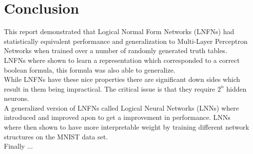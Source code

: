 \chapter{Conclusion}\label{C:con}


This report demonstrated that Logical Normal Form Networks (LNFNs) had statistically equivalent performance and generalization to Multi-Layer Perceptron Networks when trained over a number of randomly generated truth tables. LNFNs where shown to learn a representation which corresponded to a correct boolean formula, this formula was also able to generalize.\\

While LNFNs have these nice properties there are significant down sides which result in them being impractical. The critical issue is that they require $2^n$ hidden neurons.\\

A generalized version of LNFNs called Logical Neural Networks (LNNs) where introduced and improved apon to get a improvement in performance. LNNs where then shown to have more interpretable weight by training different network structures on the MNIST data set.\\

Finally ...
